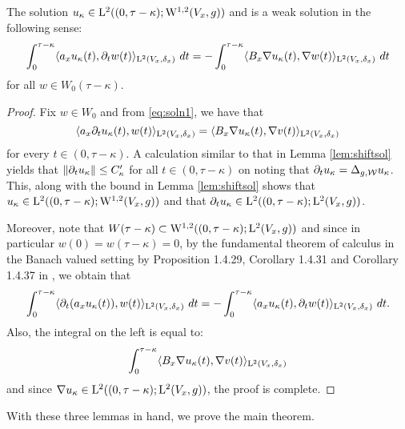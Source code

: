 \documentclass[a4paper, 12pt]{amsart}
\begin{document}
\begin{lemma}
\label{Lem:testfn2} 
The solution $u_\kappa \in {\rm L}^{2}_{\rm {}}((0, \tau - \kappa); {{\rm W}^{1,2}_{\rm {}}}(V_x, g))$
and is a weak solution in the following sense:
\begin{equation}
\label{eq:testfn2} 
\int_{0}^{\tau - \kappa} \langle a_x u_\kappa(t), \partial_t w(t) \rangle_{{\rm L}^{2}_{\rm {}}(V_x,\delta_x)}\ dt 
		= -\int_{0}^{\tau - \kappa } \langle B_x \nabla u_\kappa(t), \nabla w(t) \rangle_{{\rm L}^{2}_{\rm {}}(V_x, \delta_x)}\ dt
\end{equation}
for all $w \in W_0(\tau - \kappa)$.
\end{lemma}
\begin{proof}
Fix $w \in W_0$ and from \eqref{eq:soln1}, we have that
$$\langle a_x \partial_t u_\kappa (t), w(t) \rangle_{{\rm L}^{2}_{\rm {}}(V_x, \delta_x)} 
		= \langle  B_x \nabla u_\kappa(t), \nabla v(t) \rangle_{{\rm L}^{2}_{\rm {}}(V_x, \delta_x)}$$
for every $t \in (0, \tau - \kappa)$.
A calculation similar to that in Lemma \ref{lem:shiftsol} 
yields that $\|  \partial_t u_\kappa \| \leq C_\kappa'$
for all $t \in (0, \tau - \kappa)$
on noting that $\partial_t u_\kappa = \Delta_{g,\mathcal{W}} u_\kappa$.
This, along with the bound in Lemma \ref{lem:shiftsol}
shows that  $u_\kappa \in {\rm L}^{2}_{\rm {}}((0, \tau - \kappa); {{\rm W}^{1,2}_{\rm {}}}(V_x, g))$
and that $\partial_t u_\kappa \in {\rm L}^{2}_{\rm {}}((0,\tau - \kappa); {\rm L}^{2}_{\rm {}}(V_x, g))$. 

Moreover, note that $W(\tau- \kappa) \subset {{\rm W}^{1,2}_{\rm {}}}((0,\tau-\kappa); {\rm L}^{2}_{\rm {}}(V_x,g))$
and since in particular $w(0) = w(\tau - \kappa) = 0$, by the fundamental theorem of calculus in the Banach 
valued setting by Proposition 1.4.29, Corollary 1.4.31 and Corollary 1.4.37 in  \cite{CH}, we obtain that
$$\int_{0}^{\tau - \kappa} \langle  \partial_t(a_x u_\kappa(t)), w(t) \rangle_{{\rm L}^{2}_{\rm {}}(V_x,\delta_x)}\ dt
	= - \int_0^{\tau - \kappa} \langle a_x u_\kappa(t), \partial_t w(t) \rangle_{{\rm L}^{2}_{\rm {}}(V_x, \delta_x)}\ dt.$$
Also, the integral on the left is equal to:
$$ \int_0^{\tau - \kappa}  \langle  B_x \nabla u_\kappa(t), \nabla v(t) \rangle_{{\rm L}^{2}_{\rm {}}(V_x, \delta_x)}$$
and since  $\nabla u_\kappa \in {\rm L}^{2}_{\rm {}}((0, \tau - \kappa); {\rm L}^{2}_{\rm {}}(V_x,g))$,
the proof is complete.
\end{proof} 

With these three lemmas in hand, we prove the main theorem.
\end{document}
